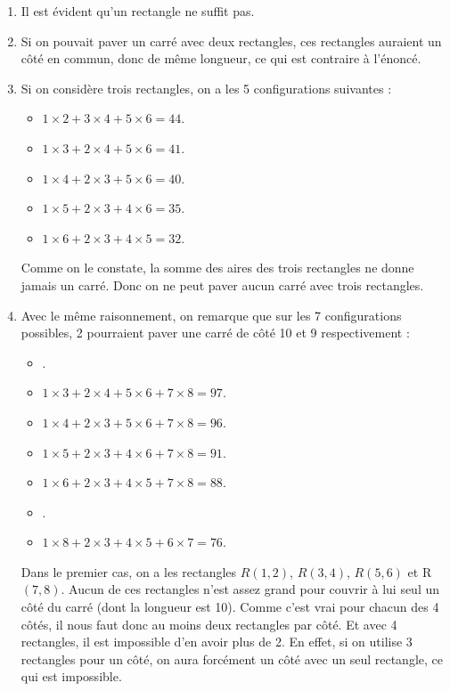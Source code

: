 \documentclass[10pt,a4paper,onecolumn]{article}
\begin{document}
\begin{enumerate}
\item Il est évident qu'un rectangle ne suffit pas.
\item Si on pouvait paver un carré avec deux rectangles, ces rectangles auraient un côté en commun, donc de même longueur, ce qui est contraire à l'énoncé.
\item Si on considère trois rectangles, on a les 5 configurations suivantes :\\
\begin{itemize}
\item $1 \times 2 + 3 \times 4 + 5 \times 6 = 44$.
\item $1 \times 3 + 2 \times 4 + 5 \times 6 = 41$.
\item $1 \times 4 + 2 \times 3 + 5 \times 6 = 40$.
\item $1 \times 5 + 2 \times 3 + 4 \times 6 = 35$.
\item $1 \times 6 + 2 \times 3 + 4 \times 5 = 32$.
\end{itemize}
Comme on le constate, la somme des aires des trois rectangles ne donne jamais un carré. Donc on ne peut paver aucun carré avec trois rectangles.
\item Avec le même raisonnement, on remarque que sur les 7 configurations possibles, 2 pourraient paver une carré de côté 10 et 9 respectivement :
\begin{itemize}
\item {}.
\item $1 \times 3 + 2 \times 4 + 5 \times 6 + 7 \times 8 = 97$.
\item $1 \times 4 + 2 \times 3 + 5 \times 6 + 7 \times 8 = 96$.
\item $1 \times 5 + 2 \times 3 + 4 \times 6 + 7 \times 8 = 91$.
\item $1 \times 6 + 2 \times 3 + 4 \times 5 + 7 \times 8 = 88$.
\item {}.
\item $1 \times 8 + 2 \times 3 + 4 \times 5 + 6 \times 7 = 76$.
\end{itemize}
Dans le premier cas, on a les rectangles $R(1,2)$, $R(3,4)$, $R(5,6)$ et R$(7,8)$. Aucun de ces rectangles n'est assez grand pour couvrir à lui seul un côté du carré (dont la longueur est 10). Comme c'est vrai pour chacun des 4 côtés, il nous faut donc au moins deux rectangles par côté. Et avec 4 rectangles, il est impossible d'en avoir plus de 2. En effet, si on utilise 3 rectangles pour un côté, on aura forcément un côté avec un seul rectangle, ce qui est impossible.


\end{enumerate}
\end{document}
